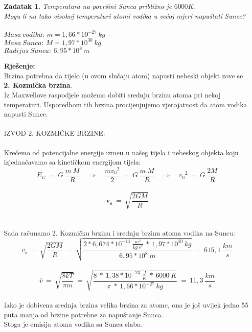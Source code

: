 \documentclass[a4paper,12pt]{article}
\newtheorem{ZDK}{Zadatak}[section]
\begin{document}
\newpage
\begin{ZDK}
	Temperatura na povr\v{s}ini Sunca pribli\v{z}no je $6000K$. \\
	Mogu li na tako visokoj temperaturi atomi vodika u ve\'coj mjeri napu\v{s}tati Sunce? \\
	\\
	$Masa\ vodika:\ m=1,66*10^{-27}\ kg$ \\
	$Masa\ Sunca:\ M=1,97*10^{30}\ kg $ \\
	$Radijus\ Sunca:\ 6,95*10^8\ m $
\end{ZDK}
\textbf{Rje\v{s}enje:} \\
\newline
Brzina potrebna da tijelo (u ovom slu\v{c}aju atom) napusti nebeski objekt zove se \textbf{2. Kozmi\v{c}ka brzina}. \\
Iz Maxwellove raspodjele mo\v{z}emo dobiti srednju brzinu atoma pri nekoj temperaturi. 
Usporedbom tih brzina procijenjujemo vjerojatnost da atom vodika napusti Sunce. 
\\
\\
IZVOD 2. KOZMI\v{C}KE BRZINE: \\
\\
Kre\'cemo od potencijalne energije izme\dj u u na\v{s}eg tijela i nebeskog objekta koju izjedna\v{c}avamo sa kineti\v{c}kom energijom tijela:
\\
$$ E_G\ =\ G\ \frac{m\ M}{R} \quad \Rightarrow \quad \frac{m{v_0}^2}{2}\ =\ G\ \frac{m\ M}{R} \quad \Rightarrow \quad {v_0}^2\ =\ G\ \frac{2M}{R} $$
\\
$$ \boldsymbol{v_s}\ =\ \sqrt{\frac{2GM}{R}} $$
\\
\\
Sada ra\v{c}unamo 2. Kozmi\v{c}ku brzinu i srednju brzinu atoma vodika na Suncu:
\\
$$ v_s\ =\ \sqrt{\frac{2GM}{R}}\ =\ \sqrt{\frac{2*6,674*10^{-11}\ \frac{m^3}{kg\ s^2}\ *\ 1,97*10^{30}\ kg}{6,95*10^8\ m}}\ =\ 615,1\ \frac{km}{s} $$
\\
$$ \overline{v}\ =\ \sqrt{\frac{8kT}{\pi m}}\ =\ \sqrt{\frac{8\ *\ 1,38*10^{-23}\ \frac{J}{K}\ *\ 6000\ K}{\pi\ *\ 1,66*10^{-27}\ kg}}\ =\ 11,3\ \frac{km}{s} $$
\\
Iako je dobivena srednja brzina velika brzina za atome, ona je jo\v{s} uvijek jedno 55 puta manja od brzine potrebne za napu\v{s}tanje Sunca. \\
Stoga je emisija atoma vodika sa Sunca slaba.
\end{document}
